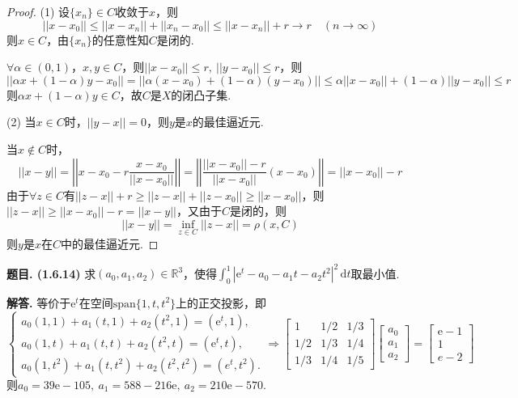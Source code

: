 \documentclass[12pt, a4paper, oneside]{ctexart}
\newcounter{problem}  %
\newenvironment{problem}[1][]{\stepcounter{problem}\par\noindent\textbf{题目\arabic{problem}. #1}}{\smallskip\par}
\newenvironment{solution}[1][]{\par\noindent\textbf{#1解答. }}{\smallskip\par}  %
\let\leq=\leqslant %
\let\geq=\geqslant %
\def\R{\mathbb{R}}          %
\def\d{\mathrm{d}}          %
\def\e{\mathrm{e}}          %
\begin{document}
\begin{proof}
    (1) 设$\{x_n\}\in C$收敛于$x$，则
    \begin{equation*}
        ||x-x_0||\leq ||x-x_n|| + ||x_n-x_0||\leq ||x-x_n||+r\to r\quad(n\to\infty)
    \end{equation*}
    则$x\in C$，由$\{x_n\}$的任意性知$C$是闭的.

    $\forall \alpha \in (0,1)$，$x,y\in C$，则$||x-x_0||\leq r,\ ||y-x_0||\leq r$，则
    \begin{equation*}
        ||\alpha x+(1-\alpha)y-x_0|| = ||\alpha(x-x_0)+(1-\alpha)(y-x_0)||\leq \alpha||x-x_0||+(1-\alpha)||y-x_0||\leq r
    \end{equation*}
    则$\alpha x+(1-\alpha)y\in C$，故$C$是$X$的闭凸子集.

    (2) 当$x\in C$时，$||y-x|| = 0$，则$y$是$x$的最佳逼近元.

    当$x\notin C$时，
    \begin{equation*}
        ||x-y|| = \left|\left|x-x_0-r\frac{x-x_0}{||x-x_0||}\right|\right| = \left|\left|\frac{||x-x_0||-r}{||x-x_0||}(x-x_0)\right|\right| = ||x-x_0||-r
    \end{equation*}
    由于$\forall z\in C$有$||z-x||+r\geq ||z-x||+||z-x_0|| \geq ||x-x_0||$，则$||z-x||\geq ||x-x_0||-r = ||x-y||$，又由于$C$是闭的，则
    \begin{equation*}
        ||x-y||=\inf_{z\in C}||z-x|| = \rho(x, C)
    \end{equation*}
    则$y$是$x$在$C$中的最佳逼近元.
\end{proof}
\begin{problem}[(1.6.14)]
    求$(a_0,a_1,a_2)\in \R^3$，使得$\int_0^1|\e^t-a_0-a_1t-a_2t^2|^2\,\d t$取最小值.
\end{problem}
\begin{solution}
    等价于$\e^t$在空间$\text{span}\{1,t,t^2\}$上的正交投影，即
    \begin{equation*}
        \begin{cases}
            a_0(1,1)+a_1(t,1)+a_2(t^2,1)=(\e^t,1),\\
            a_0(1,t)+a_1(t,t)+a_2(t^2,t)=(\e^t,t),\\
            a_0(1,t^2)+a_1(t,t^2)+a_2(t^2,t^2)=(e^t,t^2).
        \end{cases}\Rightarrow\left[\begin{matrix}
            1&1/2&1/3\\
            1/2&1/3&1/4\\
            1/3&1/4&1/5
        \end{matrix}\right]\left[\begin{matrix}
            a_0\\a_1\\a_2
        \end{matrix}\right] = \left[\begin{matrix}
            \e-1\\1\\e-2
        \end{matrix}\right]
    \end{equation*}
    则$a_0 = 39\e-105,\ a_1 = 588-216\e,\ a_2 = 210\e-570$.
\end{solution}
\end{document}
